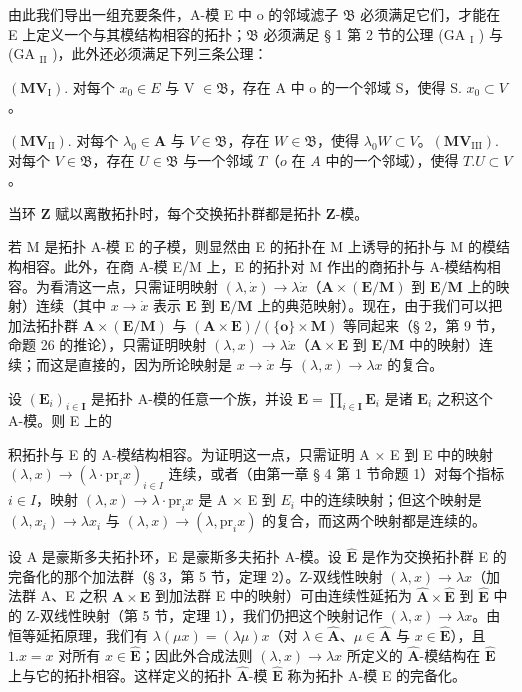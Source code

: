 由此我们导出一组充要条件，A-模 E 中 o 的邻域滤子 \(\mathfrak{B}\) 必须满足它们，才能在 E 上定义一个与其模结构相容的拓扑；\(\mathfrak{B}\) 必须满足 § 1 第 2 节的公理 (GA \(_{\mathrm{I}}\) ) 与 (GA \(_{\mathrm{II}}\) )，此外还必须满足下列三条公理：

\((\mathbf{MV}_{\mathrm{I}})\). 对每个 \(x_0 \in E\) 与 V \(\in \mathfrak{B}\)，存在 A 中 o 的一个邻域 S，使得 S. \(x_0 \subset V\)。

\((\mathbf{MV}_{\mathrm{II}})\). 对每个 \(\lambda_0 \in \mathbf{A}\) 与 \(V \in \mathfrak{B}\)，存在 \(W \in \mathfrak{B}\)，使得 \(\lambda_0 W \subset V\)。\((\mathbf{MV}_{\mathrm{III}})\). 对每个 \(V \in \mathfrak{B}\)，存在 \(U \in \mathfrak{B}\) 与一个邻域 \(T\)（\(o\) 在 \(A\) 中的一个邻域），使得 \(T. U \subset V\)。

当环 \(\mathbf{Z}\) 赋以离散拓扑时，每个交换拓扑群都是拓扑 \(\mathbf{Z}\)-模。

若 M 是拓扑 A-模 E 的子模，则显然由 E 的拓扑在 M 上诱导的拓扑与 M 的模结构相容。此外，在商 A-模 E/M 上，E 的拓扑对 M 作出的商拓扑与 A-模结构相容。为看清这一点，只需证明映射 \((\lambda, \dot{x}) \to \lambda \dot{x}\)（\(\mathbf{A} \times (\mathbf{E} / \mathbf{M})\) 到 \(\mathbf{E} / \mathbf{M}\) 上的映射）连续（其中 \(x \to \dot{x}\) 表示 \(\mathbf{E}\) 到 \(\mathbf{E} / \mathbf{M}\) 上的典范映射）。现在，由于我们可以把加法拓扑群 \(\mathbf{A} \times (\mathbf{E} / \mathbf{M})\) 与 \((\mathbf{A} \times \mathbf{E}) / (\{\mathbf{o}\} \times \mathbf{M})\) 等同起来（§ 2，第 9 节，命题 26 的推论），只需证明映射 \((\lambda, x) \to \lambda \dot{x}\)（\(\mathbf{A} \times \mathbf{E}\) 到 \(\mathbf{E} / \mathbf{M}\) 中的映射）连续；而这是直接的，因为所论映射是 \(x \to \dot{x}\) 与 \((\lambda, x) \to \lambda x\) 的复合。

设 \((\mathbf{E}_i)_{i\in \mathbf{I}}\) 是拓扑 A-模的任意一个族，并设 \(\mathbf{E} = \prod_{i\in \mathbf{I}}\mathbf{E}_i\) 是诸 \(\mathbf{E}_i\) 之积这个 A-模。则 E 上的

积拓扑与 E 的 A-模结构相容。为证明这一点，只需证明 A × E 到 E 中的映射 \((\lambda, x) \to (\lambda \cdot \text{pr}_i x)_{i \in I}\) 连续，或者（由第一章 § 4 第 1 节命题 1）对每个指标 \(i \in I\)，映射 \((\lambda, x) \to \lambda \cdot \text{pr}_i x\) 是 A × E 到 \(E_i\) 中的连续映射；但这个映射是 \((\lambda, x_i) \to \lambda x_i\) 与 \((\lambda, x) \to (\lambda, \text{pr}_i x)\) 的复合，而这两个映射都是连续的。

设 A 是豪斯多夫拓扑环，E 是豪斯多夫拓扑 A-模。设 \(\hat{\mathbf{E}}\) 是作为交换拓扑群 E 的完备化的那个加法群（§ 3，第 5 节，定理 2）。Z-双线性映射 \((\lambda, x) \to \lambda x\)（加法群 A、E 之积 \(\mathbf{A} \times \mathbf{E}\) 到加法群 E 中的映射）可由连续性延拓为 \(\hat{\mathbf{A}} \times \hat{\mathbf{E}}\) 到 \(\hat{\mathbf{E}}\) 中的 Z-双线性映射（第 5 节，定理 1），我们仍把这个映射记作 \((\lambda, x) \to \lambda x\)。由恒等延拓原理，我们有 \(\lambda(\mu x) = (\lambda \mu)x\)（对 \(\lambda \in \hat{\mathbf{A}}\)、\(\mu \in \hat{\mathbf{A}}\) 与 \(x \in \hat{\mathbf{E}}\)），且 \(1.x = x\) 对所有 \(x \in \hat{\mathbf{E}}\)；因此外合成法则 \((\lambda, x) \to \lambda x\) 所定义的 \(\hat{\mathbf{A}}\)-模结构在 \(\hat{\mathbf{E}}\) 上与它的拓扑相容。这样定义的拓扑 \(\hat{\mathbf{A}}\)-模 \(\hat{\mathbf{E}}\) 称为拓扑 A-模 E 的完备化。

